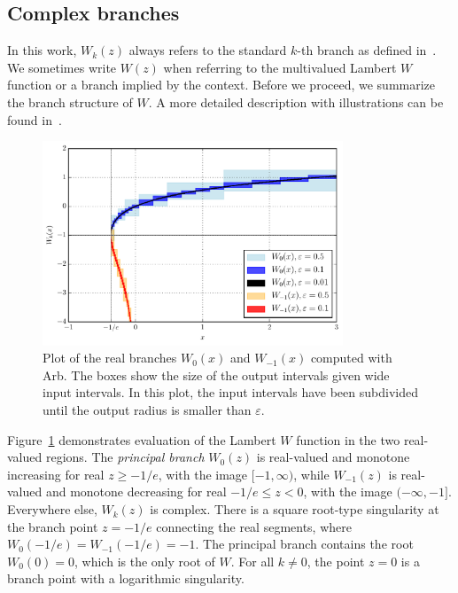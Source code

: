 \documentclass[11pt,a4paper]{article}
\begin{document}
\subsection{Complex branches}

In this work, $W_k(z)$ always refers to the standard
$k$-th branch as defined in~\cite{corless1996lambertw}.
We sometimes write $W(z)$ when referring to
the multivalued Lambert $W$ function or a
branch implied by the context.
Before we proceed, we summarize the branch structure of $W$.
A more detailed description with illustrations can be found in~\cite{corless1996lambertw}.

\begin{figure}
\begin{centering}
\includegraphics[width=0.8\textwidth]{plotx}
\caption{
Plot of the real branches $W_0(x)$ and $W_{-1}(x)$ computed with Arb.
The boxes show the size of the output intervals given wide input intervals.
In this plot, the input intervals have been subdivided until the output radius is
smaller than $\varepsilon$.}
\label{fig:real}
\end{centering}
\end{figure}

Figure~\ref{fig:real} demonstrates evaluation
of the Lambert $W$ function in the two real-valued regions.
The \emph{principal branch} $W_0(z)$ is real-valued and monotone increasing for real $z \ge -1/e$,
with the image $[-1,\infty)$, while
$W_{-1}(z)$ is real-valued and monotone decreasing for real $-1/e \le z < 0$,
with the image $(-\infty,-1]$.
Everywhere else, $W_k(z)$ is complex.
There is a square root-type singularity
at the branch point $z = -1/e$ connecting the real segments,
where $W_0(-1/e) = W_{-1}(-1/e) = -1$.
The principal branch contains the root $W_0(0) = 0$,
which is the only root of $W$. For all $k \ne 0$, the point $z = 0$
is a branch point with a logarithmic singularity.
\end{document}
